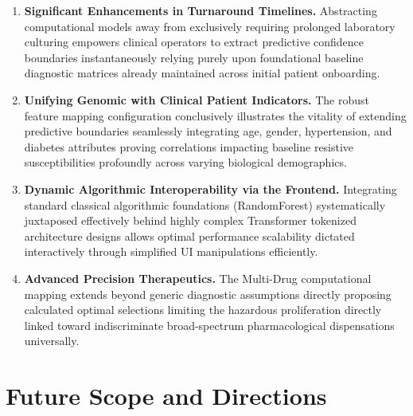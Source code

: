 \documentclass[12pt,a4paper]{report}
\begin{document}
\begin{enumerate}[leftmargin=*]
  \item \textbf{Significant Enhancements in Turnaround Timelines.}
  Abstracting computational models away from exclusively requiring prolonged laboratory culturing empowers clinical operators to extract predictive confidence boundaries instantaneously relying purely upon foundational baseline diagnostic matrices already maintained across initial patient onboarding.

  \item \textbf{Unifying Genomic with Clinical Patient Indicators.}
  The robust feature mapping configuration conclusively illustrates the vitality of extending predictive boundaries seamlessly integrating age, gender, hypertension, and diabetes attributes proving correlations impacting baseline resistive susceptibilities profoundly across varying biological demographics.

  \item \textbf{Dynamic Algorithmic Interoperability via the Frontend.}
  Integrating standard classical algorithmic foundations (RandomForest) systematically juxtaposed effectively behind highly complex Transformer tokenized architecture designs allows optimal performance scalability dictated interactively through simplified UI manipulations efficiently.

  \item \textbf{Advanced Precision Therapeutics.}
  The Multi-Drug computational mapping extends beyond generic diagnostic assumptions directly proposing calculated optimal selections limiting the hazardous proliferation directly linked toward indiscriminate broad-spectrum pharmacological dispensations universally.
\end{enumerate}

\chapter{Future Scope and Directions}
\thispagestyle{fancy}
\end{document}
